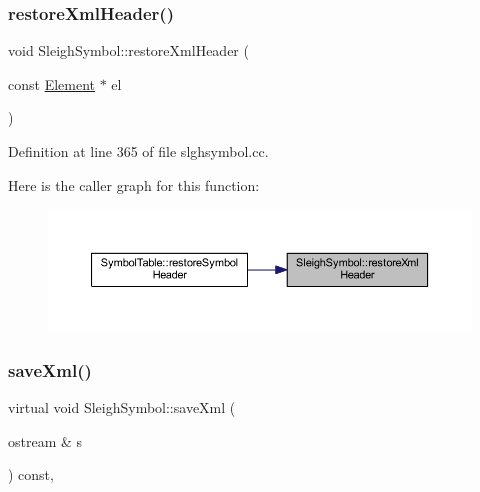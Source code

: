 \subsubsection{\texorpdfstring{restoreXmlHeader()}{restoreXmlHeader()}}
{\footnotesize\ttfamily void Sleigh\+Symbol\+::restore\+Xml\+Header (\begin{DoxyParamCaption}\item[{const \mbox{\hyperlink{class_element}{Element}} $\ast$}]{el }\end{DoxyParamCaption})}



Definition at line 365 of file slghsymbol.\+cc.

Here is the caller graph for this function\+:
\nopagebreak
\begin{figure}[H]
\begin{center}
\leavevmode
\includegraphics[width=350pt]{class_sleigh_symbol_addbcd83dac8157f1af67b21e560f4607_icgraph}
\end{center}
\end{figure}
\mbox{\label{class_sleigh_symbol_a83c9a32d16419d2277c5b9d542e1cf13}} 
\subsubsection{\texorpdfstring{saveXml()}{saveXml()}}
{\footnotesize\ttfamily virtual void Sleigh\+Symbol\+::save\+Xml (\begin{DoxyParamCaption}\item[{ostream \&}]{s }\end{DoxyParamCaption}) const\hspace{0.3cm}{\ttfamily [inline]}, {\ttfamily [virtual]}}



